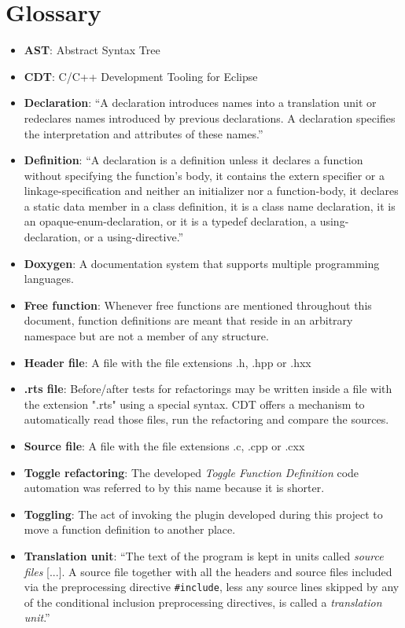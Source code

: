 \chapter{Glossary}
\thispagestyle{fancy}

\begin{itemize}
\item \textbf{AST}: Abstract Syntax Tree
\item \textbf{CDT}: C/C++ Development Tooling for Eclipse
\item \textbf{Declaration}: ``A declaration introduces names into a translation 
unit or redeclares names introduced by previous declarations. A declaration 
specifies the interpretation and attributes of these names.''\cite{IsoCpp}
\item \textbf{Definition}: ``A declaration is a definition unless it declares a 
function without specifying the function’s body, it contains the extern 
specifier or a linkage-specification and neither an initializer nor a 
function-body, it declares a static data member in a class definition, it is a 
class name declaration, it is an opaque-enum-declaration, or it is a typedef 
declaration, a using-declaration, or a using-directive.''\cite{IsoCpp}
\item \textbf{Doxygen}: A documentation system that supports multiple 
programming languages.
\item \textbf{Free function}: Whenever free functions are mentioned throughout this document, function definitions are meant that reside in an arbitrary namespace but are not a member of any structure.
\item \textbf{Header file}: A file with the file extensions .h, .hpp or .hxx
\item \textbf{.rts file}: Before/after tests for refactorings may be written 
inside a file with the extension ".rts" using a special syntax. CDT offers a 
mechanism to automatically read those files, run the refactoring and compare the 
sources.
\item \textbf{Source file}: A file with the file extensions .c, .cpp or .cxx
\item \textbf{Toggle refactoring}: The developed \textit{Toggle Function 
Definition} code automation was referred to by this name because it is shorter.
\item \textbf{Toggling}: The act of invoking the plugin developed during this 
project to move a function definition to another place.
\item \textbf{Translation unit}: ``The text of the program is kept in units 
called \textit{source files} [...]. A source file together with all the headers and 
source files included via the preprocessing directive \texttt{\#include}, less 
any source lines skipped by any of the conditional inclusion preprocessing 
directives, is called a \textit{translation unit}.''\cite{IsoCpp}
\end{itemize}

